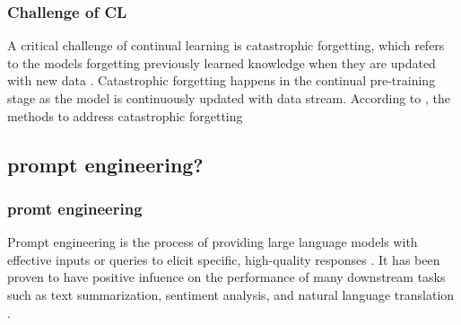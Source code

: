 \documentclass[runningheads]{llncs}
\begin{document}
\subsubsection{Challenge of CL}
A critical challenge of continual learning is catastrophic forgetting, which refers to the models forgetting previously learned knowledge 
when they are updated with new data \cite{Gupta23}. Catastrophic forgetting happens in the continual pre-training stage as the model is continuously updated with data stream.
According to \cite{Shi24}, the methods to address catastrophic forgetting

\subsection{prompt engineering?}
\subsubsection{promt engineering}
\noindent \newline
Prompt engineering is the process of providing large language models with effective inputs or queries to elicit specific, high-quality responses \cite{Zhang24}.
It has been proven to have positive infuence on the performance of many downstream tasks such as text summarization, sentiment analysis,
and natural language translation \cite{Liu21}.
\end{document}
